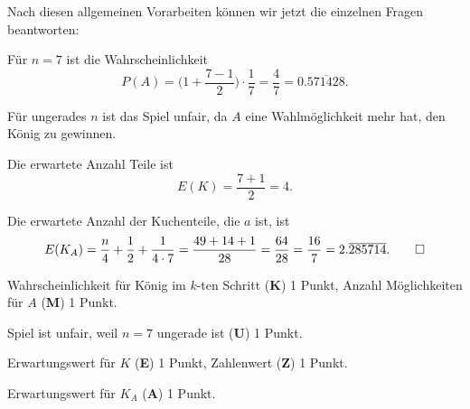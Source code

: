 \begin{loesung}
Nach diesen allgemeinen Vorarbeiten können wir jetzt die einzelnen Fragen
beantworten:
\begin{teilaufgaben}
\item
Für $n=7$ ist die Wahrscheinlichkeit 
\[
P(A)
=
\biggl(1+\frac{7-1}{2}\biggr)\cdot \frac17
=
\frac{4}{7}
=
0.\overline{571428}.
\]
\item
Für ungerades $n$ ist das Spiel unfair, da $A$ eine Wahlmöglichkeit mehr
hat, den König zu gewinnen.
\item
Die erwartete Anzahl Teile ist
\[
E(K)
=
\frac{7+1}{2}
=
4.
\]
\item
Die erwartete Anzahl der Kuchenteile, die $a$ ist, ist
\[
E(K_A)=\frac{n}4+\frac12+\frac{1}{4\cdot 7}
=
\frac{49 + 14 + 1}{28}
=
\frac{64}{28}
=
\frac{16}{7}
=
2.\overline{285714}.
\qedhere
\]
\end{teilaufgaben}

\end{loesung}

\begin{bewertung}
\begin{teilaufgaben}
\item
Wahrscheinlichkeit für König im $k$-ten Schritt ({\bf K}) 1 Punkt,
Anzahl Möglichkeiten für $A$ ({\bf M}) 1 Punkt.
\item
Spiel ist unfair, weil $n=7$ ungerade ist ({\bf U}) 1 Punkt.
\item
Erwartungswert für $K$ ({\bf E}) 1 Punkt, Zahlenwert ({\bf Z}) 1 Punkt.
\item
Erwartungswert für $K_A$ ({\bf A}) 1 Punkt.
\end{teilaufgaben}
\end{bewertung}
